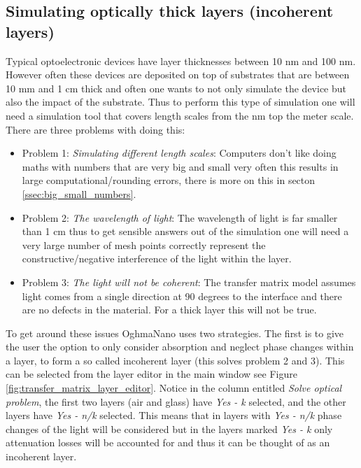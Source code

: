 \subsection{Simulating optically thick layers (incoherent layers)}
Typical optoelectronic devices have layer thicknesses between 10 nm and 100 nm.  However often these devices are deposited on top of substrates that are between 10 mm and 1 cm thick and often one wants to not only simulate the device but also the impact of the substrate. Thus to perform this type of simulation one will need a simulation tool that covers length scales from the nm top the meter scale. There are three problems with doing this:

\begin{itemize}
  \item Problem 1: \emph{Simulating different length scales}: Computers don't like doing maths with numbers that are very big and small very often this results in large computational/rounding errors, there is more on this in secton \ref{ssec:big_small_numbers}.
  \item Problem 2: \emph{The wavelength of light}: The wavelength of light is far smaller than 1 cm thus to get sensible answers out of the simulation one will need a very large number of mesh points correctly represent the constructive/negative interference of the light within the layer.
  \item Problem 3: \emph{The light will not be coherent}: The transfer matrix model assumes light comes from a single direction at 90 degrees to the interface and there are no defects in the material. For a thick layer this will not be true. 
\end{itemize}

To get around these issues OghmaNano uses two strategies. The first is to give the user the option to only consider absorption and neglect phase changes within a layer, to form a so called incoherent layer (this solves problem 2 and 3). This can be selected from the layer editor in the main window see Figure \ref{fig:transfer_matrix_layer_editor}. Notice in the column entitled \emph{Solve optical problem}, the first two layers (air and glass) have \emph{Yes - k} selected, and the other layers have \emph{Yes - n/k} selected. This means that in layers with \emph{Yes - n/k} phase changes of the light will be considered but in the layers marked \emph{Yes - k} only attenuation losses will be accounted for and thus it can be thought of as an incoherent layer.

